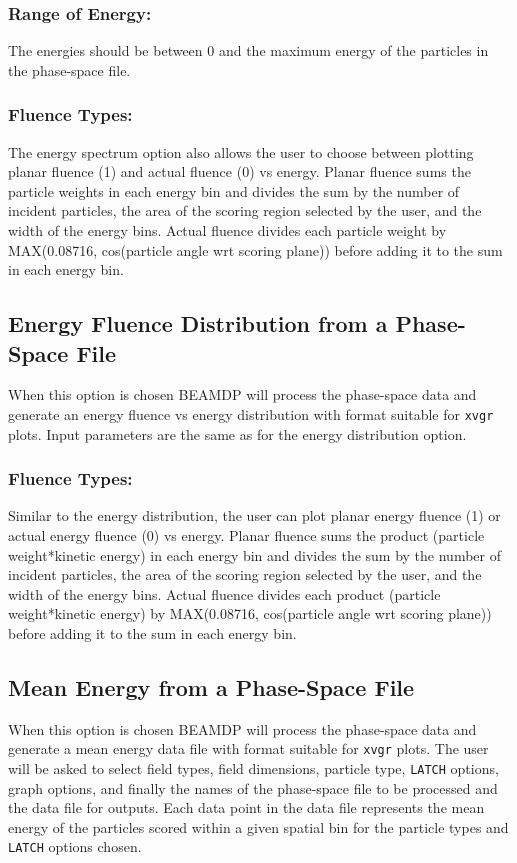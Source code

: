 \documentclass[12pt,twoside]{article}
\begin{document}
\subsubsection{Range of Energy:}
The energies should be between 0 and the maximum energy of the particles
in the phase-space file.

\subsubsection{Fluence Types:}
\label{fluencetype3}
The energy spectrum option also allows the user to choose between plotting
planar fluence (1) and actual fluence (0) vs energy.  Planar fluence
sums the particle weights in each energy bin and divides the sum by the
number of incident particles, the area of the scoring region selected
by the user, and the width of the energy bins.  Actual fluence divides
each particle weight by
MAX(0.08716, cos(particle angle wrt scoring plane)) before adding
it to the sum in each energy bin.

\subsection{Energy Fluence Distribution from a Phase-Space File}
When this option is chosen BEAMDP will process the phase-space data and
generate an energy fluence vs energy distribution with format suitable for
\verb+xvgr+ plots.  Input parameters are the same as for the energy
distribution option.

\subsubsection{Fluence Types:}
\label{fluencetype4}
Similar to the energy distribution, the user can plot planar energy fluence (1) or
actual energy fluence (0) vs energy.  Planar fluence
sums the product (particle weight*kinetic energy) in each energy bin and
divides the sum by the
number of incident particles, the area of the scoring region selected
by the user, and the width of the energy bins.  Actual fluence divides
each product (particle weight*kinetic energy) by
MAX(0.08716, cos(particle angle wrt scoring plane)) before adding
it to the sum in each energy bin.

\subsection{Mean Energy from a Phase-Space File}

When this option is chosen BEAMDP will process the phase-space data and
generate a mean energy data file with format suitable for \verb+xvgr+ plots. The
user will be asked to select field types, field dimensions, particle type,
\verb+LATCH+ options, graph options, and finally the names of the phase-space
file to be processed and the data file for outputs.  Each data point in
the data file represents the mean energy of the particles scored within a
given spatial bin for the particle types and \verb+LATCH+ options chosen.
\end{document}
